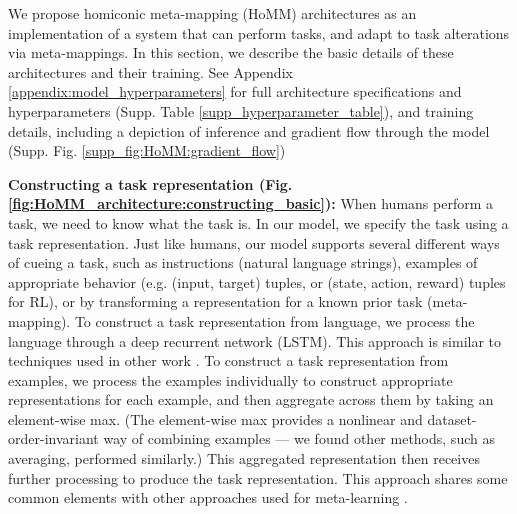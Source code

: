 We propose homiconic meta-mapping (HoMM) architectures as an implementation of a system that can perform tasks, and adapt to task alterations via meta-mappings. In this section, we describe the basic details of these architectures and their training. See Appendix \ref{appendix:model_hyperparameters} for full architecture specifications and hyperparameters (Supp. Table \ref{supp_hyperparameter_table}), and training details, including a depiction of inference and gradient flow through the model (Supp. Fig. \ref{supp_fig:HoMM:gradient_flow})

\textbf{Constructing a task representation (Fig. \ref{fig:HoMM_architecture:constructing_basic}):} When humans perform a task, we need to know what the task is. In our model, we specify the task using a task representation. Just like humans, our model supports several different ways of cueing a task, such as instructions (natural language strings), examples of appropriate behavior (e.g. (input, target) tuples, or (state, action, reward) tuples for RL), or by transforming a representation for a known prior task (meta-mapping). To construct a task representation from language, we process the language through a deep recurrent network (LSTM). This approach is similar to techniques used in other work \citep[e.g.]{Hermann2017,Oh2017a,Hill2019a}. To construct a task representation from examples, we process the examples individually to construct appropriate representations for each example, and then aggregate across them by taking an element-wise max. (The element-wise max provides a nonlinear and dataset-order-invariant way of combining examples \citep[c.f.][]{Zaheer2017} --- we found other methods, such as averaging, performed similarly.) This aggregated representation then receives further processing to produce the task representation. This approach shares some common elements with other approaches used for meta-learning \citep{Garnelo2018}. 

